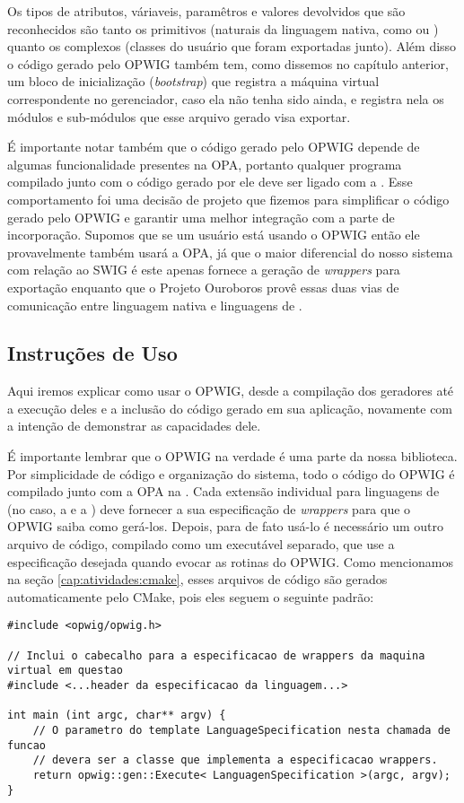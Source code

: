 Os tipos de atributos, váriaveis, paramêtros e valores devolvidos que são reconhecidos
são tanto os primitivos (naturais da linguagem nativa, como  ou )
quanto os complexos (classes do usuário que foram exportadas junto). Além disso o código
gerado pelo OPWIG também tem, como dissemos no capítulo anterior, um bloco de inicialização
(\textit{bootstrap}) que registra a máquina virtual correspondente no gerenciador,
caso ela não tenha sido ainda, e registra nela os módulos e sub-módulos que esse
arquivo gerado visa exportar.

É importante notar também que o código gerado pelo OPWIG depende de algumas funcionalidade
presentes na OPA, portanto qualquer programa compilado junto com o código gerado por ele deve
ser ligado com a . Esse comportamento foi uma decisão de
projeto que fizemos para simplificar o código gerado pelo OPWIG e garantir uma melhor integração
com a parte de incorporação. Supomos que se um usuário está usando o OPWIG então ele provavelmente
também usará a OPA, já que o maior diferencial do nosso sistema com relação ao SWIG é este
apenas fornece a geração de \textit{wrappers} para exportação enquanto que o Projeto Ouroboros
provê essas duas vias de comunicação entre linguagem nativa e linguagens de \script{}.

\subsection{Instruções de Uso}
Aqui iremos explicar como usar o OPWIG, desde a compilação dos geradores até a execução
deles e a inclusão do código gerado em sua aplicação, novamente com a intenção de demonstrar
as capacidades dele.

É importante lembrar que o OPWIG na verdade é uma parte da nossa biblioteca. Por
simplicidade de código e organização do sistema, todo o código do OPWIG é compilado
junto com a OPA na . Cada extensão individual para linguagens de \script{}
(no caso, a  e a ) deve
fornecer a sua especificação de \textit{wrappers} para que o OPWIG saiba como gerá-los.
Depois, para de fato usá-lo é necessário um outro arquivo de código, compilado
como um executável separado, que use a especificação desejada quando evocar as rotinas
do OPWIG. Como mencionamos na seção \ref{cap:atividades:cmake}, esses arquivos de código
são gerados automaticamente pelo CMake, pois eles seguem o seguinte padrão:

\vspace{1em}
\begin{lstlisting}
#include <opwig/opwig.h>

// Inclui o cabecalho para a especificacao de wrappers da maquina virtual em questao
#include <...header da especificacao da linguagem...>

int main (int argc, char** argv) {
    // O parametro do template LanguageSpecification nesta chamada de funcao
    // devera ser a classe que implementa a especificacao wrappers.
    return opwig::gen::Execute< LanguagenSpecification >(argc, argv);
}
\end{lstlisting}
\vspace{1em}

